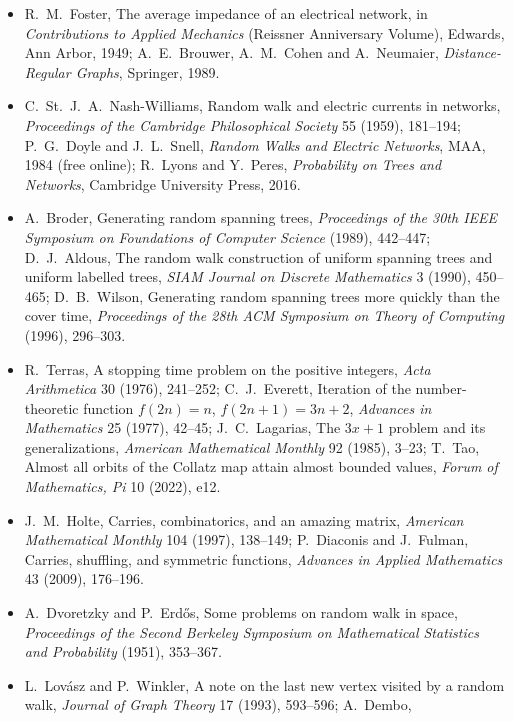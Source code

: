\begin{itemize}
{IEEE Symposium on Foundations of Computer Science} (1979), 218--223; O.~Reingold, Undirected connectivity in log-space, \emph{Journal of the ACM}
55 (2008), article 17.
\item R.~M.~Foster, The average impedance of an electrical network, in \emph{Contributions to Applied Mechanics} (Reissner Anniversary
Volume), Edwards, Ann Arbor, 1949; A.~E.~Brouwer, A.~M.~Cohen and A.~Neumaier, \emph{Distance-Regular Graphs}, Springer, 1989.
\item C.~St.~J.~A.~Nash-Williams, Random walk and electric currents in networks, \emph{Proceedings of the Cambridge Philosophical Society} 55
(1959), 181--194; P.~G.~Doyle and J.~L.~Snell, \emph{Random Walks and Electric Networks}, MAA, 1984 (free online); R.~Lyons and Y.~Peres,
\emph{Probability on Trees and Networks}, Cambridge University Press, 2016.
\item A.~Broder, Generating random spanning trees, \emph{Proceedings of the 30th IEEE Symposium on Foundations of Computer Science} (1989),
442--447; D.~J.~Aldous, The random walk construction of uniform spanning trees and uniform labelled trees, \emph{SIAM Journal on Discrete
Mathematics} 3 (1990), 450--465; D.~B.~Wilson, Generating random spanning trees more quickly than the cover time, \emph{Proceedings of the 28th
ACM Symposium on Theory of Computing} (1996), 296--303.
\item R.~Terras, A stopping time problem on the positive integers, \emph{Acta Arithmetica} 30 (1976), 241--252; C.~J.~Everett, Iteration of the
number-theoretic function $f(2n)=n$, $f(2n+1)=3n+2$, \emph{Advances in Mathematics} 25 (1977), 42--45; J.~C.~Lagarias, The $3x+1$ problem and its
generalizations, \emph{American Mathematical Monthly} 92 (1985), 3--23; T.~Tao, Almost all orbits of the Collatz map attain almost bounded
values, \emph{Forum of Mathematics, Pi} 10 (2022), e12.
\item J.~M.~Holte, Carries, combinatorics, and an amazing matrix, \emph{American Mathematical Monthly} 104 (1997), 138--149; P.~Diaconis and
J.~Fulman, Carries, shuffling, and symmetric functions, \emph{Advances in Applied Mathematics} 43 (2009), 176--196.
\item A.~Dvoretzky and P.~Erdős, Some problems on random walk in space, \emph{Proceedings of the Second Berkeley Symposium on Mathematical
Statistics and Probability} (1951), 353--367.
\item L.~Lovász and P.~Winkler, A note on the last new vertex visited by a random walk, \emph{Journal of Graph Theory} 17 (1993), 593--596; A.~Dembo,

\end{itemize}
